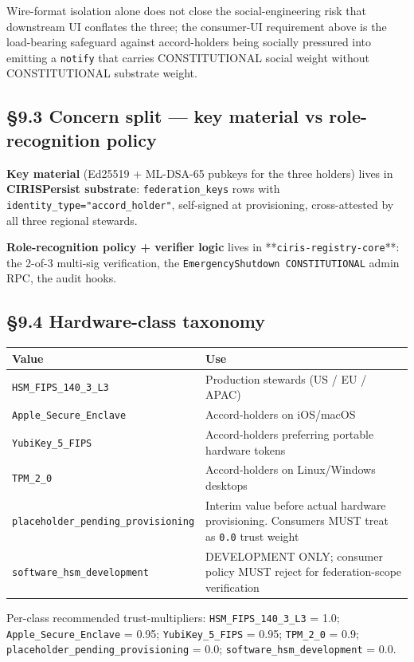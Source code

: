 \documentclass[11pt]{article}
\begin{document}
Wire-format isolation alone does not close the social-engineering risk that downstream UI conflates the three; the consumer-UI requirement above is the load-bearing safeguard against accord-holders being socially pressured into emitting a \texttt{notify} that carries CONSTITUTIONAL social weight without CONSTITUTIONAL substrate weight.


\subsection*{§9.3 Concern split — key material vs role-recognition policy}


\textbf{Key material} (Ed25519 + ML-DSA-65 pubkeys for the three holders) lives in \textbf{CIRISPersist substrate}: \texttt{federation\_keys} rows with \texttt{identity\_type="accord\_holder"}, self-signed at provisioning, cross-attested by all three regional stewards.


\textbf{Role-recognition policy + verifier logic} lives in **\texttt{ciris-registry-core}**: the 2-of-3 multi-sig verification, the \texttt{EmergencyShutdown CONSTITUTIONAL} admin RPC, the audit hooks.


\subsection*{§9.4 Hardware-class taxonomy}


{\footnotesize
\begin{longtable}{|p{8.0cm}|p{8.0cm}|}\hline
\textbf{Value} & \textbf{Use} \\ \hline\endhead
\texttt{HSM\_FIPS\_140\_3\_L3} & Production stewards (US / EU / APAC) \\ \hline
\texttt{Apple\_Secure\_Enclave} & Accord-holders on iOS/macOS \\ \hline
\texttt{YubiKey\_5\_FIPS} & Accord-holders preferring portable hardware tokens \\ \hline
\texttt{TPM\_2\_0} & Accord-holders on Linux/Windows desktops \\ \hline
\texttt{placeholder\_pending\_provisioning} & Interim value before actual hardware provisioning. Consumers MUST treat as \texttt{0.0} trust weight \\ \hline
\texttt{software\_hsm\_development} & DEVELOPMENT ONLY; consumer policy MUST reject for federation-scope verification \\ \hline
\end{longtable}}


Per-class recommended trust-multipliers: \texttt{HSM\_FIPS\_140\_3\_L3} = 1.0; \texttt{Apple\_Secure\_Enclave} = 0.95; \texttt{YubiKey\_5\_FIPS} = 0.95; \texttt{TPM\_2\_0} = 0.9; \texttt{placeholder\_pending\_provisioning} = 0.0; \texttt{software\_hsm\_development} = 0.0.
\end{document}
